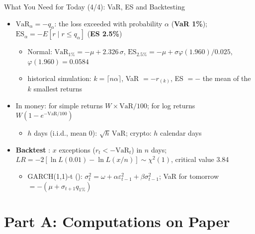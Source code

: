 \begin{frame}{What You Need for Today (4/4): VaR, ES and Backtesting}
\itemsize{\footnotesize}
\begin{itemize}
    \item $\mathrm{VaR}_\alpha = -q_\alpha$: the loss exceeded with probability $\alpha$ (\textbf{VaR 1\%}); $\mathrm{ES}_\alpha = -E[r \mid r \le q_\alpha]$ (\textbf{ES 2.5\%})
    \begin{itemize}
        \item Normal: $\mathrm{VaR}_{1\%} = -\mu + 2.326\,\sigma$, $\mathrm{ES}_{2.5\%} = -\mu + \sigma\varphi(1.960)/0.025$, $\varphi(1.960) = 0.0584$
        \item historical simulation: $k = \lceil n\alpha\rceil$, VaR $= -r_{(k)}$, ES $= -$ the mean of the $k$ smallest returns
    \end{itemize}
    \item In money: for simple returns $W \times \mathrm{VaR}/100$; for log returns $W(1 - e^{-\mathrm{VaR}/100})$
    \begin{itemize}
        \item $h$ days (i.i.d., mean 0): $\sqrt{h}\,\mathrm{VaR}$; crypto: $h$ calendar days
    \end{itemize}
    \item \textbf{Backtest} : $x$ exceptions ($r_t < -\mathrm{VaR}_t$) in $n$ days; $LR = -2[\ln L(0.01) - \ln L(x/n)] \sim \chi^2(1)$, critical value 3.84
    \begin{itemize}
        \item GARCH(1,1)-t (): $\sigma_t^2 = \omega + \alpha\varepsilon_{t-1}^2 + \beta\sigma_{t-1}^2$; VaR for tomorrow $= -(\mu + \sigma_{t+1}q_{1\%})$
    \end{itemize}
\end{itemize}
\end{frame}


\section{Part A: Computations on Paper}

